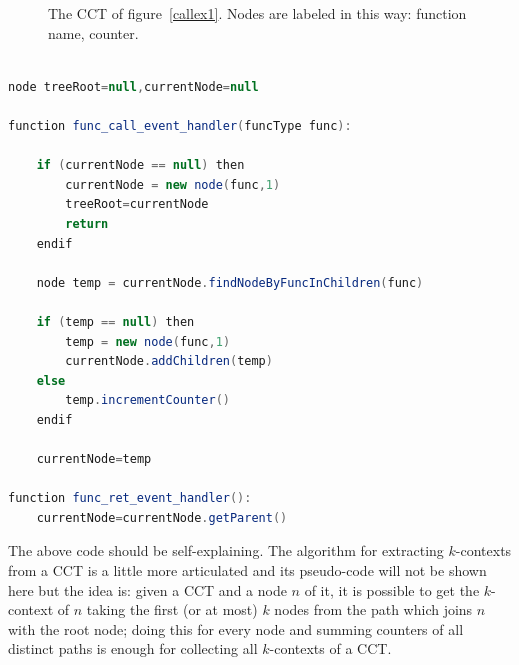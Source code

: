 \documentclass[a4paper,11pt]{report}
\begin{document}
\begin{figure}[t]

\begin{center}
\end{center}

\caption{The CCT of figure~\ref{callex1}. Nodes are labeled in this way: function name, counter.}
\label{cct1}

\end{figure}
\begin{lstlisting}[language=java, caption=An algorithm for building a CCT, morekeywords={function,then,endif},frame=leftline,framesep=10pt]

node treeRoot=null,currentNode=null

function func_call_event_handler(funcType func):

	if (currentNode == null) then 	
		currentNode = new node(func,1) 
		treeRoot=currentNode
		return
	endif

	node temp = currentNode.findNodeByFuncInChildren(func)

	if (temp == null) then
		temp = new node(func,1)
		currentNode.addChildren(temp)
	else
		temp.incrementCounter()
	endif

	currentNode=temp

function func_ret_event_handler():
	currentNode=currentNode.getParent()

\end{lstlisting}

The above code should be self-explaining.
The algorithm for extracting $k$-contexts from a CCT is a little more articulated 
and its pseudo-code will not be shown here but the idea is: given a CCT and a node $n$ of it, it is possible to get the $k$-context of $n$ taking the first (or at most) $k$ nodes from the path which joins $n$ with the root node; doing this for every node and summing counters of all distinct paths is enough for collecting all $k$-contexts of a CCT.
\end{document}
